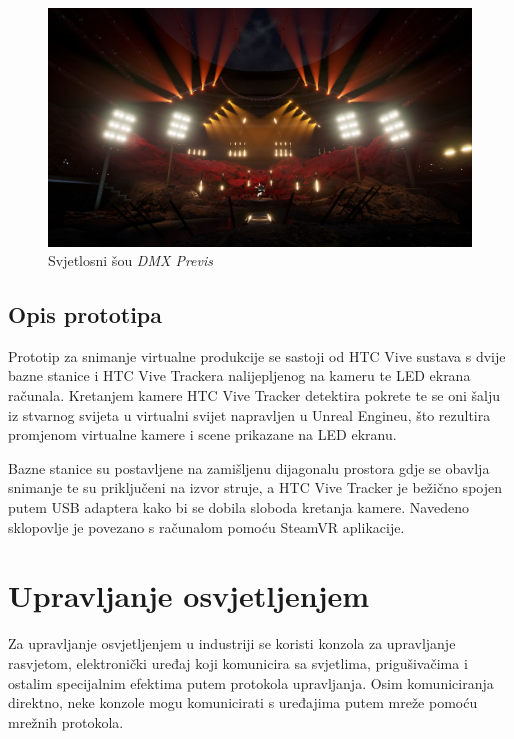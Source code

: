 \documentclass[times, utf8, zavrsni, numeric]{fer}
\begin{document}
\begin{figure}[htp]
	\centering
	\includegraphics[width=\linewidth]{slika 2-4.png}
	\caption{Svjetlosni šou \emph{DMX Previs} \cite{dmx_previs}}
	\label{fig:slika 2-4}
\end{figure}

\pagebreak

\section{Opis prototipa}
Prototip za snimanje virtualne produkcije se sastoji od HTC Vive sustava s dvije bazne stanice i HTC Vive Trackera nalijepljenog na kameru te LED ekrana računala. Kretanjem kamere HTC Vive Tracker detektira pokrete te se oni šalju iz stvarnog svijeta u virtualni svijet napravljen u Unreal Engineu, što rezultira promjenom virtualne kamere i scene prikazane na LED ekranu.\newline

Bazne stanice su postavljene na zamišljenu dijagonalu prostora gdje se obavlja snimanje te su priključeni na izvor struje, a HTC Vive Tracker je bežično spojen putem USB adaptera kako bi se dobila sloboda kretanja kamere. Navedeno sklopovlje je povezano s računalom pomoću SteamVR aplikacije.

\chapter{Upravljanje osvjetljenjem}
Za upravljanje osvjetljenjem u industriji se koristi konzola za upravljanje rasvjetom, elektronički uređaj koji komunicira sa svjetlima, prigušivačima i ostalim specijalnim efektima putem protokola upravljanja. Osim komuniciranja direktno, neke konzole mogu komunicirati s uređajima putem mreže pomoću mrežnih protokola.
\end{document}
